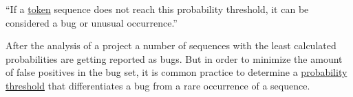 \begin{definition}\label{def:probability_threshold}
    ``If a \hyperref[def:token]{token} sequence does not reach this probability threshold, it can be considered a bug or unusual occurrence.''
\end{definition}

After the analysis of a project a number of sequences with the least calculated probabilities are getting reported as bugs. But in order to minimize the amount of false positives in the bug set, it is common practice to determine a \hyperref[def:probability_threshold]{probability threshold} that differentiates a bug from a rare occurrence of a sequence. 